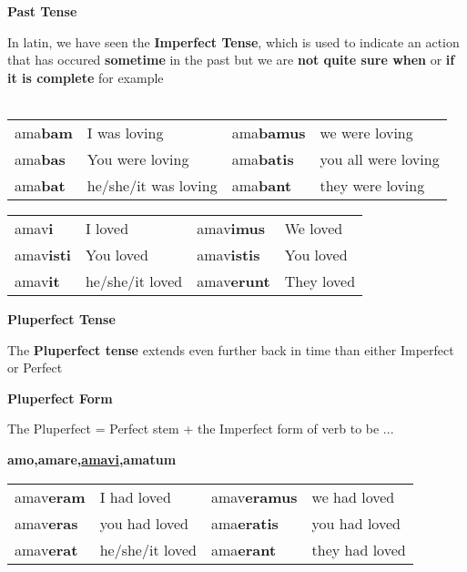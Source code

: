\begin{center}
  {\textbf{\huge Past Tense}}
\end{center}
In latin, we have seen the \textbf{Imperfect Tense},
which is used to indicate an action that has occured 
\textbf{sometime} in the past but we are \textbf{not quite 
sure when } or \textbf{if it is complete} for example \\ \\
\begin{center}
   \begin{tabular}{llll}
    ama\textbf{bam} & I was loving & ama\textbf{bamus} & we were loving \\ 
    ama\textbf{bas} & You were loving & ama\textbf{batis} & you all were loving \\ 
    ama\textbf{bat} & he/she/it was loving & ama\textbf{bant} & they were loving 
   \end{tabular} 
\end{center}
\begin{center}
  \begin{tabular}{llll}
    amav\textbf{i} & I loved & amav\textbf{imus} & We loved \\ 
    amav\textbf{isti} & You loved & amav\textbf{istis} & You loved \\ 
    amav\textbf{it} & he/she/it loved & amav\textbf{erunt} & They loved 
  \end{tabular}
\end{center}
\begin{center}
  {\textbf{\huge Pluperfect Tense}}
\end{center}
The \textbf{Pluperfect tense} extends even further back in time
than either Imperfect or Perfect \\ 
\begin{center}
  {\textbf{\huge Pluperfect Form}}
\end{center}
The Pluperfect = Perfect stem + the Imperfect form of verb to be ...
\begin{center}
  \textbf{\Large amo,amare,\underline{amavi},amatum}
\end{center}
\begin{center}
  \begin{tabular}{llll}
    amav\textbf{eram} & I had loved & amav\textbf{eramus} & we had loved \\ 
    amav\textbf{eras} & you had loved & ama\textbf{eratis} & you had loved \\ 
    amav\textbf{erat} & he/she/it loved & ama\textbf{erant} & they had loved
  \end{tabular}
\end{center}
